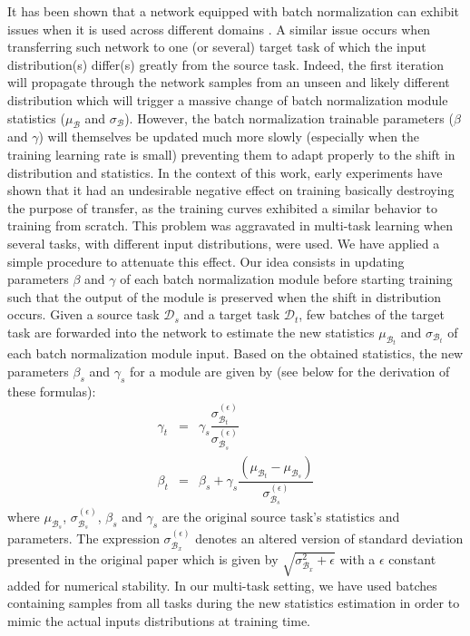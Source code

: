 It has been shown that a network equipped with batch normalization \cite{ioffe2015batch} can exhibit issues when it is used across different domains \cite{li2018adaptive, chang2019domain}. A similar issue occurs when transferring such network to one (or several) target task of which the input distribution(s) differ(s) greatly from the source task. Indeed, the first iteration will propagate through the network samples from an unseen and likely different distribution which will trigger a massive change of batch normalization module statistics ($\mu_\mathcal{B}$ and $\sigma_\mathcal{B}$). However, the batch normalization trainable parameters ($\beta$ and $\gamma$) will themselves be updated much more slowly (especially when the training learning rate is small) preventing them to adapt properly to the shift in distribution and statistics. In the context of this work, early experiments have shown that it had an undesirable negative effect on training basically destroying the purpose of transfer, as the training curves exhibited a similar behavior to training from scratch. This problem was aggravated in multi-task learning when several tasks, with different input distributions, were used. We have applied a simple procedure to attenuate this effect. Our idea consists in updating parameters $\beta$ and $\gamma$ of each batch normalization module before starting training such that the output of the module is preserved when the shift in distribution occurs. Given a source task $\mathcal{D}_s$ and a target task $\mathcal{D}_t$, few batches of the target task are forwarded into the network to estimate the new statistics $\mu_{\mathcal{B}_t}$ and $\sigma_{\mathcal{B}_t}$ of each batch normalization module input. Based on the obtained statistics, the new parameters $\beta_s$ and $\gamma_s$ for a module are given by (see below for the derivation of these formulas):
\begin{eqnarray}
\gamma_t &=& \gamma_s \dfrac{\sigma^{(\epsilon)}_{\mathcal{B}_t}}{\sigma^{(\epsilon)}_{\mathcal{B}_s}}\label{app:mtask:eqn:bn_update_gamma}\\
\beta_t &=& \beta_s + \gamma_s  \dfrac{(\mu_{\mathcal{B}_t}-\mu_{\mathcal{B}_s})}{\sigma^{(\epsilon)}_{\mathcal{B}_s}}\label{app:mtask:eqn:bn_update_beta}
\end{eqnarray}
where $\mu_{\mathcal{B}_s}$, $\sigma^{(\epsilon)}_{\mathcal{B}_s}$, $\beta_s$ and $\gamma_s$ are the original source task's statistics and parameters. The expression $\sigma^{(\epsilon)}_{\mathcal{B}_x}$ denotes an altered version of standard deviation presented in the original paper which is given by $\sqrt{\sigma_{\mathcal{B}_x}^2 + \epsilon}$ with a $\epsilon$ constant added for numerical stability. In our multi-task setting, we have used batches containing samples from all tasks during the new statistics estimation in order to mimic the actual inputs distributions at training time.

